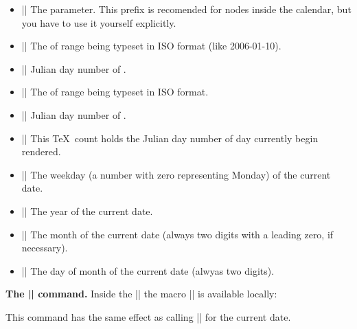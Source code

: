 \begin{command}{\pgfcalendar{}}
  \begin{itemize}
  \item |\pgfcalendarprefix|
    The  parameter. This prefix is recomended for nodes
    inside the calendar, but you have to use it yourself explicitly.
  \item |\pgfcalendarbeginiso|
    The  of range being typeset in ISO format (like 2006-01-10).
  \item |\pgfcalendarbeginjulian|
    Julian day number of .
  \item |\pgfcalendarendiso|
    The  of range being typeset in ISO format.
  \item |\pgfcalendarendjulian|
    Julian day number of .
  \item |\pgfcalendarcurrentjulian| This \TeX\ count holds the 
    Julian day number of day currently begin rendered.
  \item |\pgfcalendarcurrentweekday| The weekday
    (a number with zero representing Monday) of the current date.
  \item |\pgfcalendarcurrentyear| The year of the current date.
  \item |\pgfcalendarcurrentmonth| The month of the current date
    (always two digits with a leading zero, if necessary).
  \item |\pgfcalendarcurrentday| The day of month of the current date
    (alwyas two digits).
  \end{itemize}

  \medskip
  {\bfseries The |\ifdate| command.}
  Inside the |\pgfcalendar| the macro |\ifdate| is available
  locally:
  \begin{command}{\ifdate{}}
    \label{ifdate}%
    This command has the same effect as calling |\pgfcalendarifdate|
    for the current date.
  \end{command}


\end{command}
